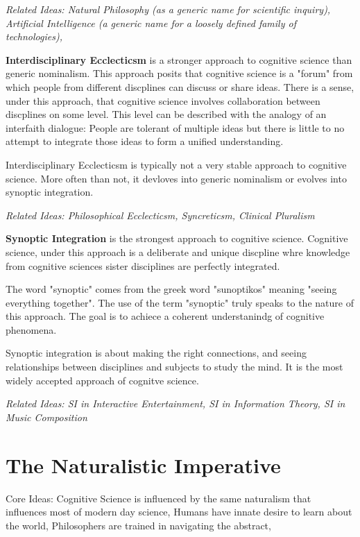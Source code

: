 \documentclass[twoside]{article}
\begin{document}
\textit{ Related Ideas: Natural Philosophy (as a generic name for scientific inquiry),
         Artificial Intelligence (a generic name for a loosely defined family of technologies),
                    }

\textbf{Interdisciplinary Ecclecticsm} is a stronger approach to cognitive science
than generic nominalism. This approach posits that cognitive science is a "forum"
from which people from different discplines can discuss or share ideas. There is
a sense, under this approach, that cognitive science involves collaboration between
discplines on some level. This level can be described with the analogy of an interfaith
dialogue: People are tolerant of multiple ideas but there is little to no attempt
to integrate those ideas to form a unified understanding.

Interdisciplinary Ecclecticsm is typically not a very stable approach to cognitive
science. More often than not, it devloves into generic nominalism or evolves into
synoptic integration.

\textit{Related Ideas: Philosophical Ecclecticsm, Syncreticsm, Clinical Pluralism }

\textbf{Synoptic Integration} is the strongest approach to cognitive science. Cognitive
science, under this approach is a deliberate and unique discpline whre knowledge
from cognitive sciences sister disciplines are perfectly integrated.

The word "synoptic" comes from the greek word "sunoptikos" meaning "seeing everything
together". The use of the term "synoptic" truly speaks to the nature of this approach.
The goal is to achiece a coherent understanindg of cognitive phenomena.

Synoptic integration is about making the right connections, and seeing relationships
between disciplines and subjects to study the mind. It is the most widely accepted
approach of cognitve science.

\textit{Related Ideas: SI in Interactive Entertainment, SI in Information Theory, SI in Music Composition}

\section{The Naturalistic Imperative}
Core Ideas: Cognitive Science is influenced by the same naturalism that influences
most of modern day science, Humans have innate desire to learn about the world,
Philosophers are trained in navigating the abstract,
\end{document}
